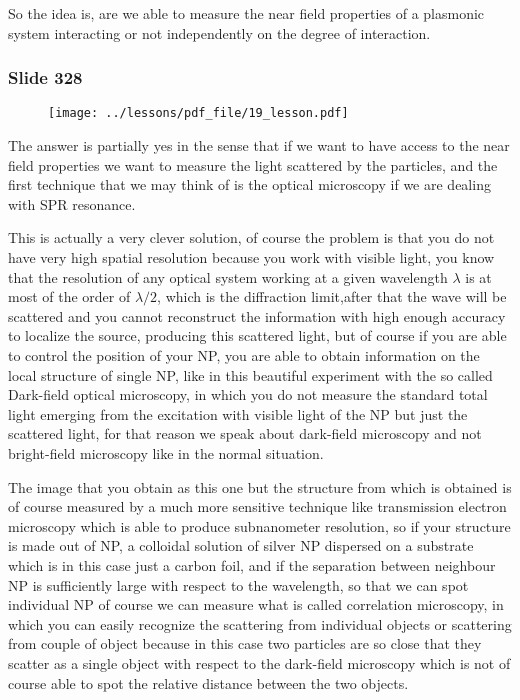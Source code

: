 \documentclass[../main/main.tex]{subfiles}
\begin{document}
So the idea is, are we able to measure the near field properties of a plasmonic system interacting or not independently on the degree of interaction. 

\newpage

\subsubsection{Slide 328}

\begin{figure}[h!]
\centering
\texttt{[image: ../lessons/pdf\_file/19\_lesson.pdf]}
\end{figure}

The answer is partially yes in the sense that if we want to have access to the near field properties we want to measure the light scattered by the particles, and the first technique that we may think of is the optical microscopy if we are dealing with SPR resonance. 

This is actually a very clever solution, of course the problem is that you do not have very high spatial resolution because you work with visible light, you know that the resolution of any optical system working at a given wavelength $\lambda$ is at most of the order of $\lambda/2$, which is the diffraction limit,after that the wave will be scattered and you cannot reconstruct the information with high enough accuracy to localize the source, producing this scattered light, but of course if you are able to control the position of your NP, you are able to obtain information on the local structure of single NP, like in this beautiful experiment with the so called Dark-field optical microscopy, in which you do not measure the standard total light emerging from the excitation with visible light of the NP but just the scattered light, for that reason we speak about dark-field microscopy and not bright-field microscopy like in the normal situation.

The image that you obtain as this one but the structure from which is obtained is of course measured by a much more sensitive technique like transmission electron microscopy which is able to produce subnanometer resolution, so if your structure is made out of NP, a colloidal solution of silver NP dispersed on a substrate which is in this case just a carbon foil, and if the separation between neighbour NP is sufficiently large with respect to the wavelength, so that we can spot individual NP of course we can measure what is called correlation microscopy, in which you can easily recognize the scattering from individual objects or scattering from couple of object because in this case two particles are so close that they scatter as a single object with respect to the dark-field microscopy which is not of course able to spot the relative distance between the two objects. 
\end{document}
